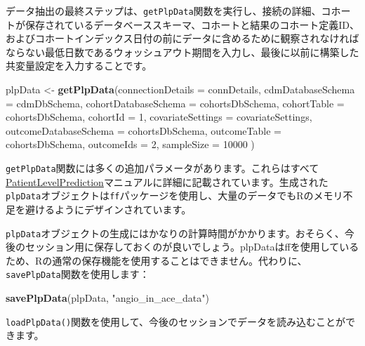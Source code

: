 \documentclass[
  11pt]{book}
\newenvironment{Shaded}{\begin{snugshade}}{\end{snugshade}}
\newcommand{\AttributeTok}[1]{\textcolor[rgb]{0.13,0.29,0.53}{#1}}
\newcommand{\DecValTok}[1]{\textcolor[rgb]{0.00,0.00,0.81}{#1}}
\newcommand{\FunctionTok}[1]{\textcolor[rgb]{0.13,0.29,0.53}{\textbf{#1}}}
\newcommand{\NormalTok}[1]{#1}
\newcommand{\OtherTok}[1]{\textcolor[rgb]{0.56,0.35,0.01}{#1}}
\newcommand{\StringTok}[1]{\textcolor[rgb]{0.31,0.60,0.02}{#1}}
\theoremstyle{definition}
\theoremstyle{definition}
\theoremstyle{definition}
\theoremstyle{definition}
\theoremstyle{remark}
\begin{document}
データ抽出の最終ステップは、\texttt{getPlpData}関数を実行し、接続の詳細、コホートが保存されているデータベーススキーマ、コホートと結果のコホート定義ID、およびコホートインデックス日付の前にデータに含めるために観察されなければならない最低日数であるウォッシュアウト期間を入力し、最後に以前に構築した共変量設定を入力することです。

\begin{Shaded}
\begin{Highlighting}[]
\NormalTok{plpData }\OtherTok{\textless{}{-}} \FunctionTok{getPlpData}\NormalTok{(}\AttributeTok{connectionDetails =}\NormalTok{ connDetails,}
                      \AttributeTok{cdmDatabaseSchema =}\NormalTok{ cdmDbSchema,}
                      \AttributeTok{cohortDatabaseSchema =}\NormalTok{ cohortsDbSchema,}
                      \AttributeTok{cohortTable =}\NormalTok{ cohortsDbSchema,}
                      \AttributeTok{cohortId =} \DecValTok{1}\NormalTok{,}
                      \AttributeTok{covariateSettings =}\NormalTok{ covariateSettings,}
                      \AttributeTok{outcomeDatabaseSchema =}\NormalTok{ cohortsDbSchema,}
                      \AttributeTok{outcomeTable =}\NormalTok{ cohortsDbSchema,}
                      \AttributeTok{outcomeIds =} \DecValTok{2}\NormalTok{,}
                      \AttributeTok{sampleSize =} \DecValTok{10000}
\NormalTok{)}
\end{Highlighting}
\end{Shaded}

\texttt{getPlpData}関数には多くの追加パラメータがあります。これらはすべて\href{https://ohdsi.github.io/PatientLevelPrediction/}{PatientLevelPrediction}マニュアルに詳細に記載されています。生成された\texttt{plpData}オブジェクトは\texttt{ff}パッケージを使用し、大量のデータでもRのメモリ不足を避けるようにデザインされています。

\texttt{plpData}オブジェクトの生成にはかなりの計算時間がかかります。おそらく、今後のセッション用に保存しておくのが良いでしょう。plpDataはffを使用しているため、Rの通常の保存機能を使用することはできません。代わりに、\texttt{savePlpData}関数を使用します：

\begin{Shaded}
\begin{Highlighting}[]
\FunctionTok{savePlpData}\NormalTok{(plpData, }\StringTok{"angio\_in\_ace\_data"}\NormalTok{)}
\end{Highlighting}
\end{Shaded}

\texttt{loadPlpData()}関数を使用して、今後のセッションでデータを読み込むことができます。
\end{document}
